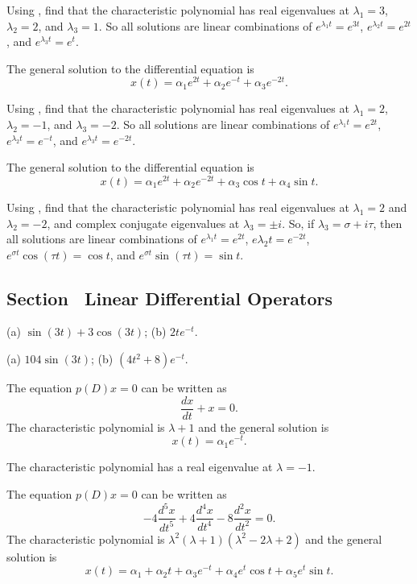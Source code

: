 \soln Using \Matlab, find that the characteristic polynomial has real
eigenvalues at $\lambda_1 = 3$, $\lambda_2 = 2$, and $\lambda_3 = 1$.  So
all solutions are linear combinations of $e^{\lambda_1 t} = e^{3t}$,
$e^{\lambda_2 t} = e^{2t}$, and $e^{\lambda_3 t} = e^t$.

 \ans The general solution to the differential equation is
\[
x(t) = \alpha_1e^{2t} + \alpha_2e^{-t} + \alpha_3e^{-2t}.
\]

\soln Using \Matlab, find that the characteristic polynomial has real
eigenvalues at $\lambda_1 = 2$, $\lambda_2 = -1$, and $\lambda_3 = -2$.  So
all solutions are linear combinations of $e^{\lambda_1 t} = e^{2t}$,
$e^{\lambda_2 t} = e^{-t}$, and $e^{\lambda_3 t} = e^{-2t}$.

\newpage
{} \ans The general solution to the differential equation is
\[
x(t) = \alpha_1e^{2t} + \alpha_2e^{-2t} + \alpha_3\cos t +
\alpha_4\sin t.
\]

\soln Using \Matlab, find that the characteristic polynomial has real
eigenvalues at $\lambda_1 = 2$ and $\lambda_2 = -2$, and complex
conjugate eigenvalues at $\lambda_3 = \pm i$.  So, if $\lambda_3 =
\sigma + i\tau$, then all solutions are linear combinations of
$e^{\lambda_1 t} = e^{2t}$, $e{\lambda_2 t} = e^{-2t}$,
$e^{\sigma t}\cos(\tau t) = \cos t$, and $e^{\sigma t}\sin(\tau t) = \sin t$.



\subsection*{Section~\protect{\ref{S:LDO}} Linear Differential Operators}

 \ans (a) $\sin(3t)+3\cos(3t)$; (b) $2te^{-t}$.

 \ans (a) $104\sin(3t)$; (b) $(4t^2+8)e^{-t}$.

 \ans The equation $p(D)x = 0$ can be written as
\[
\frac{dx}{dt} + x = 0.
\]
The characteristic polynomial is
$\lambda + 1$
and the general solution is
\[
x(t) = \alpha_1e^{-t}.
\]

\soln The characteristic polynomial has a real eigenvalue at $\lambda = -1$.

 \ans The equation $p(D)x = 0$ can be written as
\[
-4\frac{d^5x}{dt^5} + 4\frac{d^4x}{dt^4} - 8\frac{d^2x}{dt^2} = 0.
\]
The characteristic polynomial is
$\lambda^2(\lambda + 1)(\lambda^2 - 2\lambda + 2)$
and the general solution is
\[
x(t) = \alpha_1 + \alpha_2 t + \alpha_3e^{-t} +
\alpha_4e^t\cos t + \alpha_5e^t\sin t.
\]

